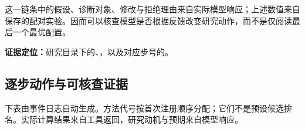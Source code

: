 这一链条中的假设、诊断对象、修改与拒绝理由来自实际模型响应；上述数值来自保存的配对实验。因而可以核查模型是否根据反馈改变研究动作，而不是仅阅读最后一个最优配置。

\noindent\textbf{证据定位：}研究目录下的、，以及对应步号的。

\subsection{逐步动作与可核查证据}

下表由事件日志自动生成。方法代号按首次注册顺序分配；它们不是预设候选排名。实际计算结果来自工具返回，研究动机与预期来自模型响应。

\begingroup\small\setlength{\tabcolsep}{4pt}

